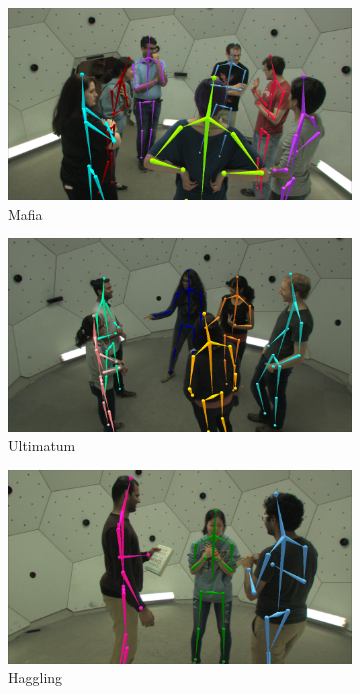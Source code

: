 \begin{figure}[t]
	\centering
	\begin{subfigure}{0.245\textwidth}
	\includegraphics[width=\textwidth]{figures/datasetEx/mafia}
		\caption{Mafia}
	\end{subfigure}
	\begin{subfigure}{0.245\textwidth}
		\includegraphics[width=\textwidth]{figures/datasetEx/ultimatum}
				\caption{Ultimatum}
	\end{subfigure}
	\begin{subfigure}{0.245\textwidth}

		\includegraphics[width=\textwidth]{figures/datasetEx/haggling}
				\caption{Haggling}
	\end{subfigure}
	\begin{subfigure}{0.245\textwidth}


\end{subfigure}
\end{figure}
